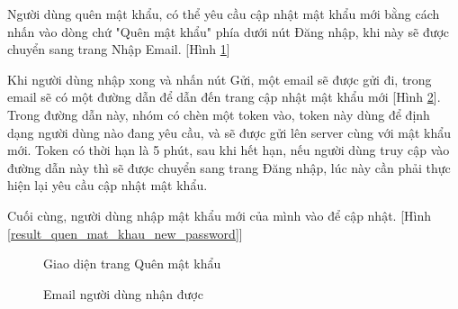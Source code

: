 Người dùng quên mật khẩu, có thể yêu cầu cập nhật mật khẩu mới bằng cách nhấn vào dòng chứ "Quên mật khẩu" phía dưới nút Đăng nhập, khi này sẽ được chuyển sang trang Nhập Email. [Hình \ref{result_quen_mat_khau_email}]\par
Khi người dùng nhập xong và nhấn nút Gửi, một email sẽ được gửi đi, trong email sẽ có một đường dẫn để dẫn đến trang cập nhật mật khẩu mới [Hình \ref{result_quen_mat_khau_email_receive}]. Trong đường dẫn này, nhóm có chèn một token vào, token này dùng để định dạng người dùng nào đang yêu cầu, và sẽ được gửi lên server cùng với mật khẩu mới. Token có thời hạn là 5 phút, sau khi hết hạn, nếu người dùng truy cập vào đường dẫn này thì sẽ được chuyển sang trang Đăng nhập, lúc này cần phải thực hiện lại yêu cầu cập nhật mật khẩu.\par
Cuối cùng, người dùng nhập mật khẩu mới của mình vào để cập nhật. [Hình \ref{result_quen_mat_khau_new_password}]

\begin{figure}[H]
    \begin{center}
        \caption{Giao diện trang Quên mật khẩu}
        \label{result_quen_mat_khau_email}
    \end{center}
\end{figure}

\begin{figure}[H]
    \begin{center}
        \caption{Email người dùng nhận được}
        \label{result_quen_mat_khau_email_receive}
    \end{center}
\end{figure}

